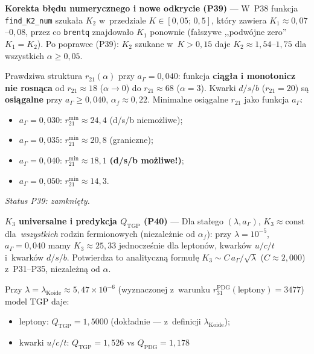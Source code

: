 \begin{problem}
\begin{description}[leftmargin=2em, labelindent=0pt]
  \textbf{Korekta b\l{}\k{e}du numerycznego i nowe odkrycie (P39)} ---
  W~P38 funkcja \texttt{find\_K2\_num} szuka\l{}a $K_2$ w~przedziale
  $K \in [0{,}05;\,0{,}5]$, kt\'ory zawiera $K_1 \approx 0{,}07$--$0{,}08$,
  przez co \texttt{brentq} znajdowa\l{}o $K_1$ ponownie (fa\l{}szywe
  ,,podw\'ojne zero'' $K_1 = K_2$).
  Po poprawce (P39): $K_2$ szukane w~$K > 0{,}15$ daje
  $K_2 \approx 1{,}54$--$1{,}75$ dla wszystkich $\alpha \geq 0{,}05$.
  \par
  Prawdziwa struktura $r_{21}(\alpha)$ przy $a_\Gamma = 0{,}040$:
  funkcja \textbf{ci\k{a}g\l{}a i monotonicz nie rosn\k{a}ca}
  od $r_{21} \approx 18$ ($\alpha \to 0$) do $r_{21} \approx 68$ ($\alpha = 3$).
  Kwarki $d/s/b$ ($r_{21} = 20$) s\k{a} \textbf{osi\k{a}galne}
  przy $a_\Gamma \geq 0{,}040$, $\alpha_f \approx 0{,}22$.
  Minimalne osi\k{a}galne $r_{21}$ jako funkcja $a_\Gamma$:
  \begin{itemize}[nosep]
    \item $a_\Gamma = 0{,}030$: $r_{21}^\mathrm{min} \approx 24{,}4$ (d/s/b niemo\.zliwe);
    \item $a_\Gamma = 0{,}035$: $r_{21}^\mathrm{min} \approx 20{,}8$ (graniczne);
    \item $a_\Gamma = 0{,}040$: $r_{21}^\mathrm{min} \approx 18{,}1$ \textbf{(d/s/b mo\.zliwe!)};
    \item $a_\Gamma = 0{,}050$: $r_{21}^\mathrm{min} \approx 14{,}3$.
  \end{itemize}
  \textit{Status P39: zamkni\k{e}ty.}
  \par
  \textbf{$K_3$ universalne i predykcja $Q_\mathrm{TGP}$ (P40)} ---
  Dla sta\l{}ego $(\lambda, a_\Gamma)$,
  $K_3 \approx \mathrm{const}$ dla~\emph{wszystkich} rodzin fermionowych
  (niezale\.znie od $\alpha_f$):
  przy $\lambda = 10^{-5}$, $a_\Gamma = 0{,}040$ mamy
  $K_3 \approx 25{,}33$ jednocze\'snie dla leptonów, kwarków $u/c/t$
  i~kwarków $d/s/b$. Potwierdza to analityczn\k{a} formu\l{}\k{e}
  $K_3 \sim C\,a_\Gamma/\sqrt{\lambda}$ ($C \approx 2{,}000$)
  z~P31--P35, niezale\.zn\k{a} od $\alpha$.
  \par
  Przy $\lambda = \lambda_\mathrm{Koide} \approx 5{,}47 \times 10^{-6}$
  (wyznaczonej z~warunku $r_{31}^\mathrm{PDG}(\text{leptony}) = 3477$)
  model TGP daje:
  \begin{itemize}[nosep]
    \item leptony: $Q_\mathrm{TGP} = 1{,}5000$ (dok\l{}adnie --- z~definicji $\lambda_\mathrm{Koide}$);
    \item kwarki $u/c/t$: $Q_\mathrm{TGP} = 1{,}526$ vs $Q_\mathrm{PDG} = 1{,}178$

\end{itemize}
\end{description}
\end{problem}

